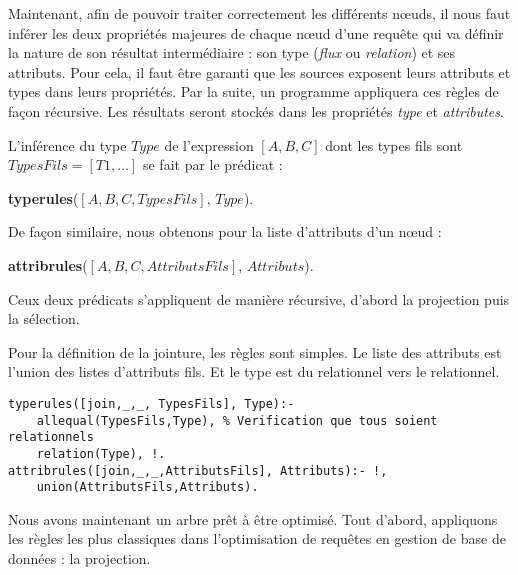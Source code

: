 Maintenant, afin de pouvoir traiter correctement les différents nœuds, il nous faut inférer les deux propriétés majeures de chaque nœud d'une requête qui va définir la nature de son résultat intermédiaire : son type (\textit{flux} ou \textit{relation}) et ses attributs. Pour cela, il faut être garanti que les sources exposent leurs attributs et types dans leurs propriétés. Par la suite, un programme appliquera ces règles de façon récursive. Les résultats seront stockés dans les propriétés \textit{type} et \textit{attributes}.

\begin{regle}
L'inférence du type $Type$ de l'expression $[A,B,C]$ dont les types fils sont $TypesFils=[T1,...]$ se fait par le prédicat :
\begin{center} \textbf{typerules}($[A,B,C,TypesFils]$, $Type$).\end{center}
De façon similaire, nous obtenons pour la liste d'attributs d'un nœud :
\begin{center} \textbf{attribrules}($[A,B,C,AttributsFils]$, $Attributs$).\end{center}
Ceux deux prédicats s'appliquent de manière récursive, d'abord la projection puis la sélection.
\end{regle}


\begin{example}
	Pour la définition de la jointure, les règles sont simples. Le liste des attributs est l'union des listes d'attributs fils. Et le type est du relationnel vers le relationnel.
	\begin{lstlisting}
typerules([join,_,_, TypesFils], Type):- 
	allequal(TypesFils,Type), % Verification que tous soient relationnels 
	relation(Type), !.
attribrules([join,_,_,AttributsFils], Attributs):- !, 
	union(AttributsFils,Attributs).
	\end{lstlisting}
\end{example}

Nous avons maintenant un arbre prêt à être optimisé. Tout d'abord, appliquons les règles les plus classiques dans l'optimisation de requêtes en gestion de base de données : la projection.

